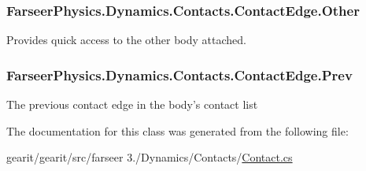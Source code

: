 \hypertarget{class_farseer_physics_1_1_dynamics_1_1_contacts_1_1_contact_edge_a8b441e56fbb8b5a5bb20f2cbeb2752d0}{
\subsubsection[{Other}]{ Farseer\+Physics.\+Dynamics.\+Contacts.\+Contact\+Edge.\+Other}}\label{class_farseer_physics_1_1_dynamics_1_1_contacts_1_1_contact_edge_a8b441e56fbb8b5a5bb20f2cbeb2752d0}


Provides quick access to the other body attached. 

\hypertarget{class_farseer_physics_1_1_dynamics_1_1_contacts_1_1_contact_edge_a0f0f00948e496e0f4e965ee2bc5e28f0}{
\subsubsection[{Prev}]{ Farseer\+Physics.\+Dynamics.\+Contacts.\+Contact\+Edge.\+Prev}}\label{class_farseer_physics_1_1_dynamics_1_1_contacts_1_1_contact_edge_a0f0f00948e496e0f4e965ee2bc5e28f0}


The previous contact edge in the body's contact list 



The documentation for this class was generated from the following file\+:\begin{DoxyCompactItemize}
\item 
gearit/gearit/src/farseer 3./\+Dynamics/\+Contacts/\hyperlink{_contact_8cs}{Contact.\+cs}\end{DoxyCompactItemize}

